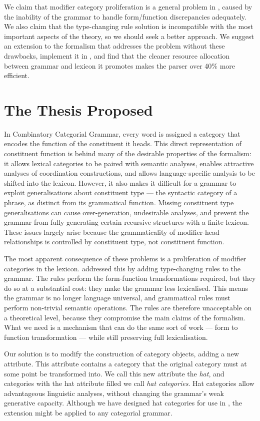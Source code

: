 We claim that modifier category proliferation is a general problem in \ccg,
caused by the inability of the grammar to handle form/function discrepancies
adequately. We also claim that the type-changing rule solution is
incompatible with the most important aspects of the \ccg theory, so we should
seek a better approach. We suggest an extension to the formalism that
addresses the problem without these drawbacks, implement it in \ccgbank, and
find that the cleaner resource allocation between grammar and lexicon it
promotes makes the parser over 40\% more efficient.

\section{The Thesis Proposed}

In Combinatory Categorial Grammar, every word is assigned a category that encodes
the function of the constituent it heads. This direct representation of constituent
function is behind many of the desirable properties of the formalism: it allows lexical
categories to be paired with semantic analyses, enables attractive
analyses of coordination constructions, and allows language-specific analysis to
be shifted into the lexicon. However, it also makes it difficult for a \ccg
grammar to exploit generalisations about constituent type --- the syntactic
category of a phrase, as distinct from its grammatical function. Missing
constituent type generalisations can cause over-generation, undesirable analyses,
and prevent the grammar from fully generating certain recursive structures
with a finite lexicon. These issues largely arise because the grammaticality
of modifier-head relationships is controlled by constituent type, not
constituent function.

The most apparent consequence of these problems is a proliferation of modifier
categories in the lexicon. \citeauthor{hock:lrec02} addressed this by adding
type-changing rules to the grammar. The rules perform the form-function
transformations required, but they do so at a substantial cost: they make the
grammar less lexicalised. This means the grammar is no longer language
universal, and grammatical rules must perform non-trivial semantic operations. The
rules are therefore unacceptable on a theoretical level, because they compromise the
main claims of the formalism. What we need is a mechanism that can do the same sort
of work --- form to function transformation --- while still preserving full
lexicalisation.

Our solution is to modify the construction of \ccg category objects, adding a
new attribute. This attribute contains a category that the original category must at
some point be transformed into. We call this new attribute the \emph{hat}, and categories
with the hat attribute filled we call \emph{hat categories}. Hat categories allow
advantageous linguistic analyses, without changing the grammar's weak generative
capacity. Although we have
designed hat categories for use in \ccg, the extension might be applied to any
categorial grammar.

